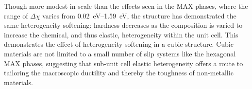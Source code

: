 Though more modest in scale than the effects seen in the MAX phases, where the range of $\Delta \chi$ varies from \SIrange{0.02}{1.59}{\electronvolt}, the  structure has demonstrated the same heterogeneity softening: hardness decreases as the composition is varied to increase the chemical, and thus elastic, heterogeneity within the unit cell. This demonstrates the effect of heterogeneity softening in a cubic structure. Cubic materials are not limited to a small number of slip systems like the hexagonal MAX phases, suggesting that sub-unit cell elastic heterogeneity offers a route to tailoring the  macroscopic ductility and thereby the toughness of non-metallic materials.
















































